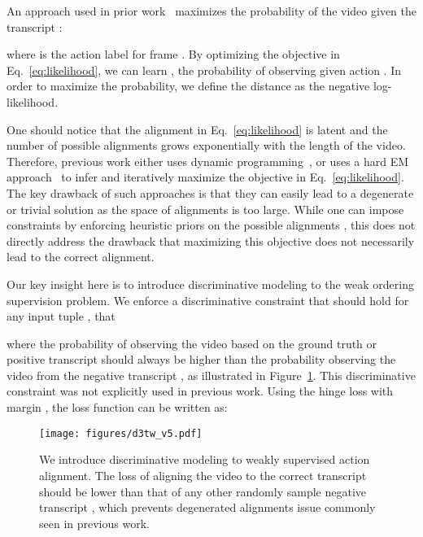 \documentclass[10pt,twocolumn,letterpaper]{article}
\newcommand{\eqnref}[1]{{Eq.\ \eqref{eq:#1}}}
\begin{document}
An approach used in prior work~\cite{huang2016connectionist,richard2017weakly,richard2018neuralnetwork} maximizes the probability of the video  given the transcript :

where  is the action label for frame . By optimizing the objective in \eqnref{likelihood}, we can learn , the probability of observing  given action . In order to maximize the probability, we define the distance  as the negative log-likelihood.

One should notice that the alignment  in  \eqnref{likelihood} is latent and the number of possible alignments grows exponentially with the length of the video. Therefore, previous work either uses dynamic programming~\cite{huang2016connectionist}, or uses a hard EM approach~\cite{richard2017weakly,richard2018neuralnetwork} to infer  and iteratively maximize the objective in \eqnref{likelihood}. The key drawback of such approaches is that they can easily lead to a degenerate or trivial solution as the space of alignments is too large. While one can impose constraints by enforcing heuristic priors on the possible alignments , this does not directly address the drawback that maximizing this objective does not necessarily lead to the correct alignment.


Our key insight here is to introduce discriminative modeling to the weak ordering supervision problem. We enforce a discriminative constraint that should hold for any input tuple , that 

where the probability of observing the video based on the ground truth or positive transcript   should always be higher than the probability observing the video from the negative transcript , as illustrated in Figure~\ref{fig:d3tw}. This discriminative constraint was not explicitly used in previous work. Using the hinge loss with margin , the loss function can be written as:




\begin{figure}[tb]
\centering
   \texttt{[image: figures/d3tw\_v5.pdf]}
\caption{
    We introduce discriminative modeling to weakly supervised action alignment. The loss  of aligning the video  to the correct transcript  should be lower than that of any other randomly sample negative transcript , which prevents degenerated alignments issue commonly seen in previous work.
   }
   \vspace{-1mm}
\label{fig:d3tw}
\end{figure}
\end{document}
